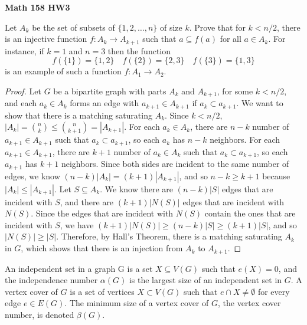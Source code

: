 \documentclass{article}
\newenvironment{problem}[2][Question]{\begin{trivlist}
\item[\hskip \labelsep {\bfseries #1}\hskip \labelsep {\bfseries #2.}]}{\end{trivlist}}
\begin{document}
 

\textbf{Math 158 HW3}

\begin{problem}{3.8.9}
    Let $A_k$ be the set of subsets of $\{1,2, \dots , n\}$ of size $k$. Prove that for $k < n/2$, there is an injective function $f: A_k \rightarrow A_{k+1}$ such that $a \subseteq f(a)$ for all $a \in A_k$. For instance, if $k = 1$ and $n = 3$ then the function
    \[
        f(\{1\}) = \{1, 2\} \quad f(\{2\}) = \{2, 3\} \quad f(\{3\}) = \{1, 3\}
    \]
    is an example of such a function $f: A_1 \rightarrow A_2$.
\end{problem}

\begin{proof}
    Let $G$ be a bipartite graph with parts $A_k$ and $A_{k+1}$, for some $k < n / 2$, and each $a_k \in A_k$ forms an edge with $a_{k+1} \in A_{k+1}$ if $a_k \subset a_{k+1}$. We want to show that there is a matching saturating $A_k$. Since $k < n / 2$, $|A_k| = {n \choose k} \leq {n \choose k + 1} = |A_{k+1}|$. For each $a_k \in A_k$, there are $n - k$ number of $a_{k+1} \in A_{k+1}$ such that $a_k \subset a_{k+1}$, so each $a_k$ has $n - k$ neighbors. For each $a_{k+1} \in A_{k+1}$, there are $k + 1$ number of $a_k \in A_k$ such that $a_k \subset a_{k+1}$, so each $a_{k+1}$ has $k + 1$ neighbors. Since both sides are incident to the same number of edges, we know $(n - k)|A_k| = (k + 1)|A_{k+1}|$, and so $n - k \geq k + 1$ because $|A_k| \leq |A_{k+1}|$. Let $S \subseteq A_k$. We know there are $(n - k)|S|$ edges that are incident with $S$, and there are $(k + 1)|N(S)|$ edges that are incident with $N(S)$. Since the edges that are incident with $N(S)$ contain the ones that are incident with $S$, we have $(k + 1)|N(S)| \geq (n - k)|S| \geq (k + 1)|S|$, and so $|N(S)| \geq |S|$. Therefore, by Hall's Theorem, there is a matching saturating $A_k$ in $G$, which shows that there is an injection from $A_k$ to $A_{k+1}$.
\end{proof}

\newpage

\begin{problem}{3.8.17}
    An independent set in a graph G is a set $X \subseteq V (G)$ such that $e(X) = 0$, and the independence number $\alpha(G)$ is the largest size of an independent set in $G$. A vertex cover of $G$ is a set of vertices $X \subset V(G)$ such that $e \cap X \neq \emptyset$ for every edge $e \in E(G)$. The minimum size of a vertex cover of $G$, the vertex cover number, is denoted $\beta(G)$.
\end{problem}
\end{document}
